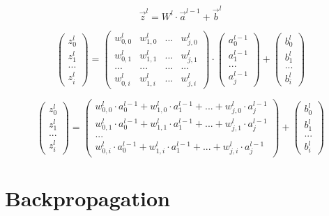 \documentclass{article}
\begin{document}
\[ \vec{z}^l = W^l \cdot \vec{a}^{l-1} + \vec{b}^l \]

\[ 
\left(\begin{array}{c} z_0^l \\ z_1^l \\ ... \\ z_i^l \end{array}\right)
=
\begin{pmatrix}
    w_{0,0}^l & w_{1,0}^l & ... & w_{j,0}^l \\
    w_{0,1}^l & w_{1,1}^l & ... & w_{j,1}^l \\
    ... & ... & ... & ... \\
    w_{0,i}^l & w_{1,i}^l & ... & w_{j,i}^l
\end{pmatrix}
\cdot
\left(\begin{array}{c} a_0^{l-1} \\ a_1^{l-1} \\ ... \\ a_j^{l-1} \end{array}\right)
+
\left(\begin{array}{c} b_0^l \\ b_1^l \\ ... \\ b_i^l \end{array}\right)
 \]

 \[
\left(\begin{array}{c} z_0^l \\ z_1^l \\ ... \\ z_i^l \end{array}\right)
=
\left(\begin{array}{c}
    w_{0,0}^l \cdot a_0^{l-1} + w_{1,0}^l \cdot a_1^{l-1} + ... + w_{j,0}^l \cdot a_j^{l-1} \\
    w_{0,1}^l \cdot a_0^{l-1} + w_{1,1}^l \cdot a_1^{l-1} + ... + w_{j,1}^l \cdot a_j^{l-1} \\
    ... \\
    w_{0,i}^l \cdot a_0^{l-1} + w_{1,i}^l \cdot a_1^{l-1} + ... + w_{j,i}^l \cdot a_j^{l-1}
\end{array}\right)
+
\left(\begin{array}{c} b_0^l \\ b_1^l \\ ... \\ b_i^l \end{array}\right)\]


\newpage
\section{Backpropagation}
\end{document}

